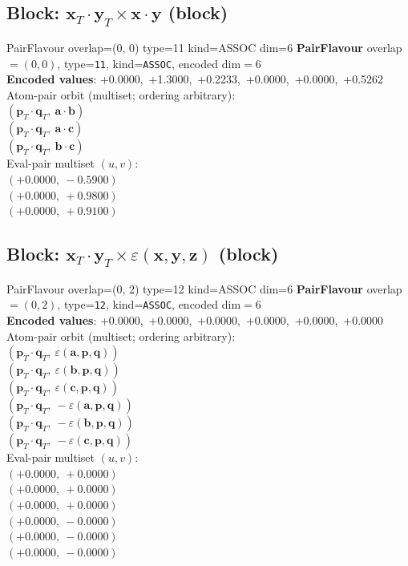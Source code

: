 \documentclass[a4paper,11pt]{article}
\newcommand{\pdcegfomjfhook}[2]{\mathbf{#1} \cdot \mathbf{#2}}
\newcommand{\fpbeomcfokjooi}[2]{\mathbf{#1}_T \cdot \mathbf{#2}_T}
\newcommand{\kblbmcpggoncpf}[3]{\varepsilon(\mathbf{#1},\mathbf{#2},\mathbf{#3})}
\begin{document}
\subsection{Block: $\fpbeomcfokjooi{x}{y} \times \pdcegfomjfhook{x}{y}$  (block)}
    PairFlavour  overlap=(0, 0)  type=11  kind=ASSOC  dim=6
\textbf{PairFlavour} overlap$=(0, 0)$, type=\texttt{11}, kind=\texttt{ASSOC}, encoded dim$=6$\\
\textbf{      Encoded values}: +0.0000,\ +1.3000,\ +0.2233,\ +0.0000,\ +0.0000,\ +0.5262\\
\quad Atom-pair orbit (multiset; ordering arbitrary):\\
$(\fpbeomcfokjooi{p}{q},\ \pdcegfomjfhook{a}{b})$\\
$(\fpbeomcfokjooi{p}{q},\ \pdcegfomjfhook{a}{c})$\\
$(\fpbeomcfokjooi{p}{q},\ \pdcegfomjfhook{b}{c})$\\
\quad Eval-pair multiset $(u, v)$:\\
$(+0.0000,\ -0.5900)$\\
$(+0.0000,\ +0.9800)$\\
$(+0.0000,\ +0.9100)$\\

\subsection{Block: $\fpbeomcfokjooi{x}{y} \times \kblbmcpggoncpf{x}{y}{z}$  (block)}
    PairFlavour  overlap=(0, 2)  type=12  kind=ASSOC  dim=6
\textbf{PairFlavour} overlap$=(0, 2)$, type=\texttt{12}, kind=\texttt{ASSOC}, encoded dim$=6$\\
\textbf{      Encoded values}: +0.0000,\ +0.0000,\ +0.0000,\ +0.0000,\ +0.0000,\ +0.0000\\
\quad Atom-pair orbit (multiset; ordering arbitrary):\\
$(\fpbeomcfokjooi{p}{q},\ \kblbmcpggoncpf{a}{p}{q})$\\
$(\fpbeomcfokjooi{p}{q},\ \kblbmcpggoncpf{b}{p}{q})$\\
$(\fpbeomcfokjooi{p}{q},\ \kblbmcpggoncpf{c}{p}{q})$\\
$(\fpbeomcfokjooi{p}{q},\ -\kblbmcpggoncpf{a}{p}{q})$\\
$(\fpbeomcfokjooi{p}{q},\ -\kblbmcpggoncpf{b}{p}{q})$\\
$(\fpbeomcfokjooi{p}{q},\ -\kblbmcpggoncpf{c}{p}{q})$\\
\quad Eval-pair multiset $(u, v)$:\\
$(+0.0000,\ +0.0000)$\\
$(+0.0000,\ +0.0000)$\\
$(+0.0000,\ +0.0000)$\\
$(+0.0000,\ -0.0000)$\\
$(+0.0000,\ -0.0000)$\\
$(+0.0000,\ -0.0000)$\\
\end{document}
